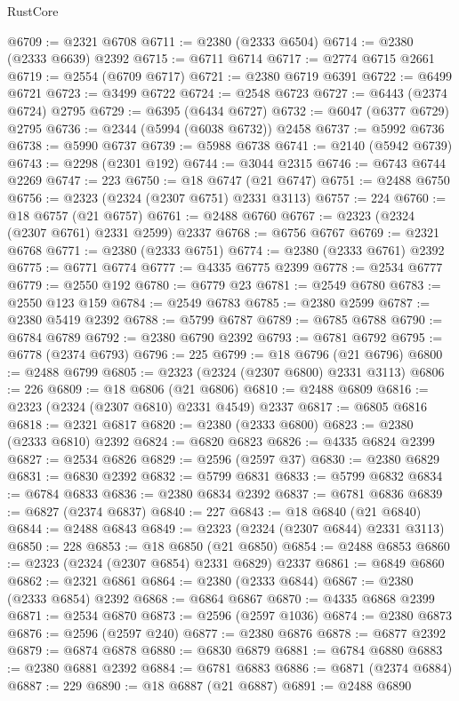 \begin{lexlean}{RustCore}
\begin{coremodule}
@6709 := @2321 @6708
@6711 := @2380 (@2333 @6504)
@6714 := @2380 (@2333 @6639) @2392
@6715 := @6711 @6714
@6717 := @2774 @6715 @2661
@6719 := @2554 (@6709 @6717)
@6721 := @2380 @6719 @6391
@6722 := @6499 @6721
@6723 := @3499 @6722
@6724 := @2548 @6723
@6727 := @6443 (@2374 @6724) @2795
@6729 := @6395 (@6434 @6727)
@6732 := @6047 (@6377 @6729) @2795
@6736 := @2344 (@5994 (@6038 @6732)) @2458
@6737 := @5992 @6736
@6738 := @5990 @6737
@6739 := @5988 @6738
@6741 := @2140 (@5942 @6739)
@6743 := @2298 (@2301 @192)
@6744 := @3044 @2315
@6746 := @6743 @6744 @2269
@6747 := 223
@6750 := @18 @6747 (@21 @6747)
@6751 := @2488 @6750
@6756 := @2323 (@2324 (@2307 @6751) @2331 @3113)
@6757 := 224
@6760 := @18 @6757 (@21 @6757)
@6761 := @2488 @6760
@6767 := @2323 (@2324 (@2307 @6761) @2331 @2599) @2337
@6768 := @6756 @6767
@6769 := @2321 @6768
@6771 := @2380 (@2333 @6751)
@6774 := @2380 (@2333 @6761) @2392
@6775 := @6771 @6774
@6777 := @4335 @6775 @2399
@6778 := @2534 @6777
@6779 := @2550 @192
@6780 := @6779 @23
@6781 := @2549 @6780
@6783 := @2550 @123 @159
@6784 := @2549 @6783
@6785 := @2380 @2599
@6787 := @2380 @5419 @2392
@6788 := @5799 @6787
@6789 := @6785 @6788
@6790 := @6784 @6789
@6792 := @2380 @6790 @2392
@6793 := @6781 @6792
@6795 := @6778 (@2374 @6793)
@6796 := 225
@6799 := @18 @6796 (@21 @6796)
@6800 := @2488 @6799
@6805 := @2323 (@2324 (@2307 @6800) @2331 @3113)
@6806 := 226
@6809 := @18 @6806 (@21 @6806)
@6810 := @2488 @6809
@6816 := @2323 (@2324 (@2307 @6810) @2331 @4549) @2337
@6817 := @6805 @6816
@6818 := @2321 @6817
@6820 := @2380 (@2333 @6800)
@6823 := @2380 (@2333 @6810) @2392
@6824 := @6820 @6823
@6826 := @4335 @6824 @2399
@6827 := @2534 @6826
@6829 := @2596 (@2597 @37)
@6830 := @2380 @6829
@6831 := @6830 @2392
@6832 := @5799 @6831
@6833 := @5799 @6832
@6834 := @6784 @6833
@6836 := @2380 @6834 @2392
@6837 := @6781 @6836
@6839 := @6827 (@2374 @6837)
@6840 := 227
@6843 := @18 @6840 (@21 @6840)
@6844 := @2488 @6843
@6849 := @2323 (@2324 (@2307 @6844) @2331 @3113)
@6850 := 228
@6853 := @18 @6850 (@21 @6850)
@6854 := @2488 @6853
@6860 := @2323 (@2324 (@2307 @6854) @2331 @6829) @2337
@6861 := @6849 @6860
@6862 := @2321 @6861
@6864 := @2380 (@2333 @6844)
@6867 := @2380 (@2333 @6854) @2392
@6868 := @6864 @6867
@6870 := @4335 @6868 @2399
@6871 := @2534 @6870
@6873 := @2596 (@2597 @1036)
@6874 := @2380 @6873
@6876 := @2596 (@2597 @240)
@6877 := @2380 @6876
@6878 := @6877 @2392
@6879 := @6874 @6878
@6880 := @6830 @6879
@6881 := @6784 @6880
@6883 := @2380 @6881 @2392
@6884 := @6781 @6883
@6886 := @6871 (@2374 @6884)
@6887 := 229
@6890 := @18 @6887 (@21 @6887)
@6891 := @2488 @6890

\end{coremodule}
\end{lexlean}
